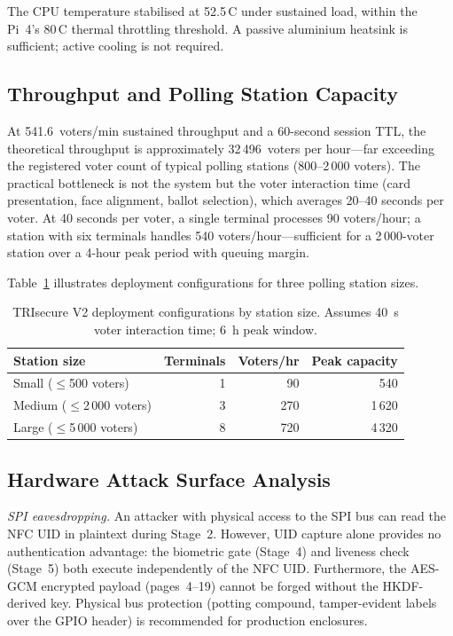 \documentclass[pdflatex,sn-vancouver-num]{sn-jnl}%
\theoremstyle{thmstyleone}%
\theoremstyle{thmstyletwo}%
\theoremstyle{thmstylethree}%
\begin{document}
The CPU temperature stabilised at 52.5\,\textdegree{}C under sustained load,
within the Pi~4's 80\,\textdegree{}C thermal throttling threshold. A passive
aluminium heatsink is sufficient; active cooling is not required.

\subsection{Throughput and Polling Station Capacity}\label{sec:throughput}

At 541.6~voters/min sustained throughput and a 60-second session TTL, the
theoretical throughput is approximately 32\,496~voters per hour---far
exceeding the registered voter count of typical polling stations
(800--2\,000 voters). The practical bottleneck is not the system but the
voter interaction time (card presentation, face alignment, ballot selection),
which averages 20--40 seconds per voter. At 40 seconds per voter, a single
terminal processes 90 voters/hour; a station with six terminals handles 540
voters/hour---sufficient for a 2\,000-voter station over a 4-hour peak period
with queuing margin.

Table~\ref{tab:throughput_scenarios} illustrates deployment configurations for
three polling station sizes.

\begin{table}[t]
\caption{TRIsecure V2 deployment configurations by station size. Assumes
  40~s voter interaction time; 6~h peak window.}
\label{tab:throughput_scenarios}%
\begin{tabular}{|l|r|r|r|}
  \hline
  Station size & Terminals & Voters/hr & Peak capacity \\
  \hline
  Small  ($\leq$500 voters)      & 1 & 90  & 540  \\
  Medium ($\leq$2\,000 voters)  & 3 & 270 & 1\,620 \\
  Large  ($\leq$5\,000 voters)  & 8 & 720 & 4\,320 \\
  \hline
\end{tabular}
\end{table}

\subsection{Hardware Attack Surface Analysis}\label{sec:hw_attack}

\textit{SPI eavesdropping.} An attacker with physical access to the SPI bus can
read the NFC UID in plaintext during Stage~2. However, UID capture alone
provides no authentication advantage: the biometric gate (Stage~4) and
liveness check (Stage~5) both execute independently of the NFC UID.
Furthermore, the AES-GCM encrypted payload (pages~4--19) cannot be forged
without the HKDF-derived key. Physical bus protection (potting compound,
tamper-evident labels over the GPIO header) is recommended for production
enclosures.
\end{document}
